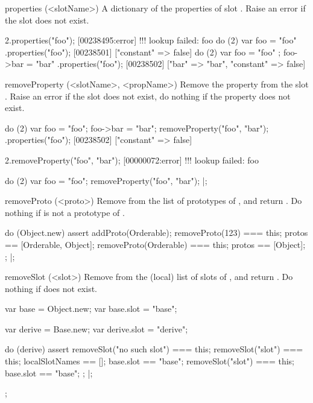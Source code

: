 \begin{urbiscriptapi}
\item[properties](<slotName>)%
  A dictionary of the properties of slot .  Raise an error if
  the slot does not exist.
\begin{urbiscript}
2.properties("foo");
[00238495:error] !!! lookup failed: foo
do (2) { var foo = "foo" }.properties("foo");
[00238501] ["constant" => false]
do (2) { var foo = "foo" ; foo->bar = "bar" }.properties("foo");
[00238502] ["bar" => "bar", "constant" => false]
\end{urbiscript}

\item[removeProperty](<slotName>, <propName>)%
  Remove the property  from the slot .
  Raise an error if the slot does not exist, do nothing if the
  property does not exist.
\begin{urbiscript}
do (2)
{
  var foo = "foo";
  foo->bar = "bar";
  removeProperty("foo", "bar");
}.properties("foo");
[00238502] ["constant" => false]

2.removeProperty("foo", "bar");
[00000072:error] !!! lookup failed: foo

do (2)
{
  var foo = "foo";
  removeProperty("foo", "bar");
}|;
\end{urbiscript}

\item[removeProto](<proto>)%
  Remove  from the list of prototypes of \this, and return \this.
  Do nothing if  is not a prototype of \this.
\begin{urbiscript}
do (Object.new)
{
  assert
  {
    addProto(Orderable);
    removeProto(123) === this;
    protos == [Orderable, Object];
    removeProto(Orderable) === this;
    protos == [Object];
  };
}|;
\end{urbiscript}

\item[removeSlot](<slot>)%
  Remove  from the (local) list of slots of \this, and return
  \this.  Do nothing if  does not exist.
\begin{urbiscript}
{
  var base = Object.new;
  var base.slot = "base";

  var derive = Base.new;
  var derive.slot = "derive";

  do (derive)
  {
    assert
    {
      removeSlot("no such slot") === this;
      removeSlot("slot") === this;
      localSlotNames == [];
      base.slot == "base";
      removeSlot("slot") === this;
      base.slot == "base";
    };
  }|;
};
\end{urbiscript}



\end{urbiscriptapi}
